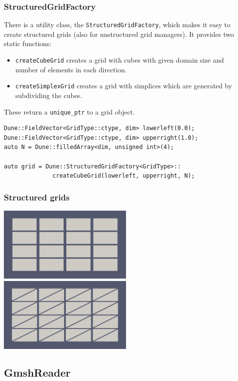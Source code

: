 \documentclass[ignorenonframetext,11pt]{beamer}
\theoremstyle{definition}
\begin{document}
\begin{frame}[fragile]
\frametitle{StructuredGridFactory}
There is a utility class, the \lstinline!StructuredGridFactory!, which makes it easy to create
structured grids (also for unstructured grid managers). It provides two static functions:
\begin{itemize}
 \item \lstinline!createCubeGrid! creates a grid with cubes with given domain size and number
of elements in each direction.
\item \lstinline!createSimplexGrid! creates a grid with simplices which are generated by subdividing
the cubes.
\end{itemize}
These return a \lstinline!unique_ptr! to a grid object.

\begin{lstlisting}[basicstyle=\scriptsize\ttfamily]
Dune::FieldVector<GridType::ctype, dim> lowerleft(0.0);
Dune::FieldVector<GridType::ctype, dim> upperright(1.0);
auto N = Dune::filledArray<dim, unsigned int>(4);

auto grid = Dune::StructuredGridFactory<GridType>::
              createCubeGrid(lowerleft, upperright, N);
\end{lstlisting}

\end{frame}

\begin{frame}
 \frametitle{Structured grids}

 \includegraphics[width=0.5\textwidth]{figures/io/structure1.png}
 \includegraphics[width=0.5\textwidth]{figures/io/structure2.png}
\end{frame}

\subsection{GmshReader}
\label{sec:gmsh}
\end{document}
